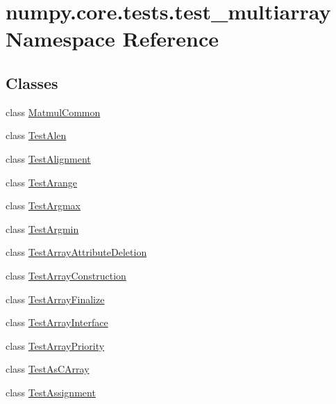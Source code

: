 \hypertarget{namespacenumpy_1_1core_1_1tests_1_1test__multiarray}{}\section{numpy.\+core.\+tests.\+test\+\_\+multiarray Namespace Reference}
\label{namespacenumpy_1_1core_1_1tests_1_1test__multiarray}
\subsection*{Classes}
\begin{DoxyCompactItemize}
\item 
class \hyperlink{classnumpy_1_1core_1_1tests_1_1test__multiarray_1_1MatmulCommon}{Matmul\+Common}
\item 
class \hyperlink{classnumpy_1_1core_1_1tests_1_1test__multiarray_1_1TestAlen}{Test\+Alen}
\item 
class \hyperlink{classnumpy_1_1core_1_1tests_1_1test__multiarray_1_1TestAlignment}{Test\+Alignment}
\item 
class \hyperlink{classnumpy_1_1core_1_1tests_1_1test__multiarray_1_1TestArange}{Test\+Arange}
\item 
class \hyperlink{classnumpy_1_1core_1_1tests_1_1test__multiarray_1_1TestArgmax}{Test\+Argmax}
\item 
class \hyperlink{classnumpy_1_1core_1_1tests_1_1test__multiarray_1_1TestArgmin}{Test\+Argmin}
\item 
class \hyperlink{classnumpy_1_1core_1_1tests_1_1test__multiarray_1_1TestArrayAttributeDeletion}{Test\+Array\+Attribute\+Deletion}
\item 
class \hyperlink{classnumpy_1_1core_1_1tests_1_1test__multiarray_1_1TestArrayConstruction}{Test\+Array\+Construction}
\item 
class \hyperlink{classnumpy_1_1core_1_1tests_1_1test__multiarray_1_1TestArrayFinalize}{Test\+Array\+Finalize}
\item 
class \hyperlink{classnumpy_1_1core_1_1tests_1_1test__multiarray_1_1TestArrayInterface}{Test\+Array\+Interface}
\item 
class \hyperlink{classnumpy_1_1core_1_1tests_1_1test__multiarray_1_1TestArrayPriority}{Test\+Array\+Priority}
\item 
class \hyperlink{classnumpy_1_1core_1_1tests_1_1test__multiarray_1_1TestAsCArray}{Test\+As\+C\+Array}
\item 
class \hyperlink{classnumpy_1_1core_1_1tests_1_1test__multiarray_1_1TestAssignment}{Test\+Assignment}

\end{DoxyCompactItemize}
